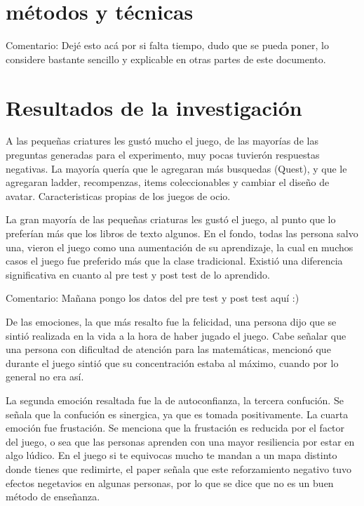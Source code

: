 \documentclass{article}
\begin{document}
\section{métodos y técnicas}
    Comentario: Dejé esto acá por si falta tiempo, dudo que se pueda poner, lo considere bastante sencillo y explicable en otras partes de este documento.
\newline 
\newline 


\section{Resultados de la investigación}
    A las pequeñas criatures les gustó mucho el juego, de las mayorías de las preguntas generadas para el experimento, muy pocas tuvierón respuestas negativas. La mayoría quería que le agregaran más busquedas (Quest), y que le agregaran ladder, recompenzas, items coleccionables y cambiar el diseño de avatar. Caracteristicas propias de los juegos de ocio. 
\newline 
\newline 


    La gran mayoría de las pequeñas criaturas les gustó el juego, al punto que lo preferían más que los libros de texto algunos. En el fondo, todas las persona salvo una, vieron el juego como una aumentación de su aprendizaje, la cual en muchos casos el juego fue preferido más que la clase tradicional. Existió una diferencia significativa en cuanto al pre test y post test de lo aprendido.
\newline 
\newline 
   
    Comentario: Mañana pongo los datos del pre test y post test aquí :) 
\newline 
\newline 


    De las emociones, la que más resalto fue la felicidad, una persona dijo que se sintió realizada en la vida a la hora de haber jugado el juego.  Cabe señalar que una persona con dificultad de atención para las matemáticas, mencionó que durante el juego sintió que su concentración estaba al máximo, cuando por lo general no era así.
\newline 
\newline 


    La segunda emoción resaltada fue la de autoconfianza, la tercera confución. Se señala que la confución es sinergica, ya que es tomada positivamente. La cuarta emoción fue frustación. Se menciona que la frustación es reducida por el factor del juego, o sea que las personas aprenden con una mayor resiliencia por estar en algo lúdico. En el juego si te equivocas mucho te mandan a un mapa distinto donde tienes que redimirte, el paper señala que este reforzamiento negativo tuvo efectos negetavios en algunas personas, por lo que se dice que no es un buen método de enseñanza.
\newline 
\newline 
\end{document}
